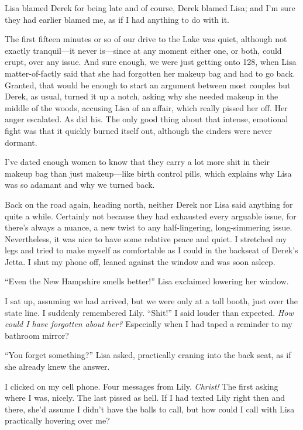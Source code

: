Lisa blamed Derek for being late and of course, Derek blamed Lisa; and
I'm sure they had earlier blamed me, as if I had anything to do with it.

The first fifteen minutes or so of our drive to the Lake was quiet,
although not exactly tranquil---it never is---since at any moment either
one, or both, could erupt, over any issue. And sure enough, we were just
getting onto 128, when Lisa matter-of-factly said that she had forgotten
her makeup bag and had to go back. Granted, that would be enough to
start an argument between most couples but Derek, as usual, turned it up
a notch, asking why she needed makeup in the middle of the woods,
accusing Lisa of an affair, which really pissed her off. Her anger
escalated. As did his. The only good thing about that intense, emotional
fight was that it quickly burned itself out, although the cinders were
never dormant.

I've dated enough women to know that they carry a lot more shit in their
makeup bag than just makeup---like birth control pills, which explains
why Lisa was so adamant and why we turned back.

Back on the road again, heading north, neither Derek nor Lisa said
anything for quite a while. Certainly not because they had exhausted
every arguable issue, for there's always a nuance, a new twist to any
half-lingering, long-simmering issue. Nevertheless, it was nice to have
some relative peace and quiet. I stretched my legs and tried to make
myself as comfortable as I could in the backseat of Derek's Jetta. I
shut my phone off, leaned against the window and was soon asleep.

``Even the New Hampshire smells better!'' Lisa exclaimed lowering her
window.

I sat up, assuming we had arrived, but we were only at a toll booth,
just over the state line. I suddenly remembered Lily. ``Shit!'' I said
louder than expected. \emph{How could I have forgotten about her?}
Especially when I had taped a reminder to my bathroom mirror?

``You forget something?'' Lisa asked, practically craning into the back
seat, as if she already knew the answer.

I clicked on my cell phone. Four messages from Lily. \emph{Christ!} The
first asking where I was, nicely. The last pissed as hell. If I had
texted Lily right then and there, she'd assume I didn't have the balls
to call, but how could I call with Lisa practically hovering over me?

